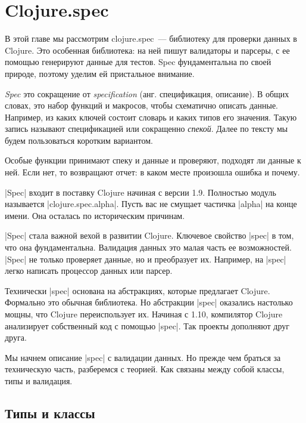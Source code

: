 \chapter{Clojure.spec}

\begin{teaser}
В этой главе мы рассмотрим clojure.spec~--- библиотеку для проверки данных в
Clojure. Это особенная библиотека: на ней пишут валидаторы и парсеры, с ее
помощью генерируют данные для тестов. Spec фундаментальна по своей природе,
поэтому уделим ей пристальное внимание.
\end{teaser}

\emph{Spec} это сокращение от \emph{specification} (анг. спецификация,
описание). В общих словах, это набор функций и макросов, чтобы схематично
описать данные. Например, из каких ключей состоит словарь и каких типов его
значения. Такую запись называют спецификацией или сокращенно
\emph{спекой}. Далее по тексту мы будем пользоваться коротким вариантом.

Особые функции принимают спеку и данные и проверяют, подходят ли данные к
ней. Если нет, то возвращают отчет: в каком месте произошла ошибка и почему.

\spverb|Spec| входит в поставку Clojure начиная с версии 1.9. Полностью модуль
называется \spverb|clojure.spec.alpha|. Пусть вас не смущает частичка
\spverb|alpha| на конце имени. Она осталась по историческим причинам.

\spverb|Spec| стала важной вехой в развитии Clojure. Ключевое свойство
\spverb|spec| в том, что она фундаментальна. Валидация данных это малая часть ее
возможностей. \spverb|Spec| не только проверяет данные, но и преобразует
их. Например, на \spverb|spec| легко написать процессор данных или парсер.

Технически \spverb|spec| основана на абстракциях, которые предлагает
Clojure. Формально это обычная библиотека. Но абстракции \spverb|spec| оказались
настолько мощны, что Clojure переиспользует их. Начиная с 1.10, компилятор
Clojure анализирует собственный код с помощью \spverb|spec|. Так проекты
дополняют друг друга.

Мы начнем описание \spverb|spec| с валидации данных. Но прежде чем браться за
техническую часть, разберемся с теорией. Как связаны между собой классы, типы и
валидация.

\section{Типы и классы}

